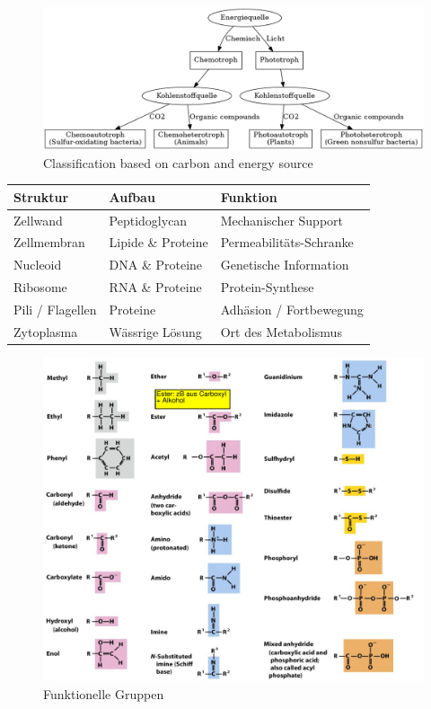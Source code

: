 \documentclass[a4paper,twocolumn,usegeometry,english,fontsize=6,DIV=16]{scrartcl}
\begin{document}
\begin{figure}
	\centering
	\includegraphics[width=0.8\linewidth]{graphs/ec_quellen.png}
	\caption{Classification based on carbon and energy source}
\end{figure}

\begin{tabu}{lll}
	\toprule
	Struktur & Aufbau & Funktion \\
	\midrule
	Zellwand & Peptidoglycan & Mechanischer Support \\
	Zellmembran & Lipide \& Proteine & Permeabilitäts-Schranke \\
	Nucleoid & DNA \& Proteine & Genetische Information \\
	Ribosome & RNA \& Proteine & Protein-Synthese \\
	Pili / Flagellen & Proteine & Adhäsion / Fortbewegung \\
	Zytoplasma & Wässrige Lösung & Ort des Metabolismus \\
	\bottomrule
\end{tabu}

\begin{figure}
	\centering
	\includegraphics[width=\linewidth]{img/funktionale_gruppen.png}
	\caption{Funktionelle Gruppen}
\end{figure}
\end{document}
